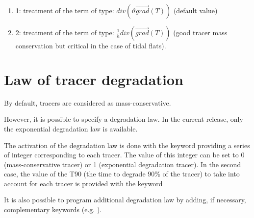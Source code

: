 \begin{enumerate}
\item[\nonumber]  1: treatment of the term of type: $div\left(\vartheta \overrightarrow{grad}\left(T\right)\right)$ (default value)

\item[\nonumber]  2: treatment of the term of type: $\frac{1}{h}div\left(\overrightarrow{grad}\left(T\right)\right)$ (good tracer mass conservation but critical in the case of tidal flats).
\end{enumerate}


\section{ Law of tracer degradation}

 By default,  tracers are considered as mass-conservative.

 However, it is possible to specify a degradation law. In the current release, only the exponential degradation law is available.

 The activation of the degradation law is done with the keyword  providing a series of integer corresponding to each tracer. The value of this integer can be set to 0 (mass-conservative tracer) or 1 (exponential degradation tracer). In the second case, the value of the T90 (the time to degrade 90\% of the tracer) to take into account for each tracer is provided with the keyword 

 It is also possible to program additional degradation law by adding, if necessary, complementary keywords (e.g. ).


